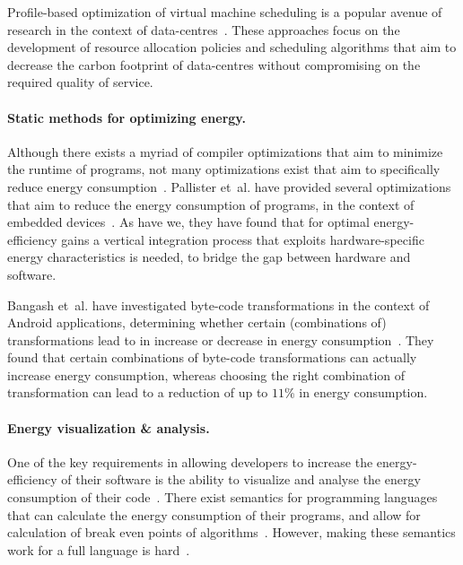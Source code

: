 Profile-based optimization of virtual machine scheduling is a popular avenue of research in the
context of data-centres~\cite{profile-based1,profile-based2,profile-based3,profile-based4}. These
approaches focus on the development of resource allocation policies and scheduling algorithms that
aim to decrease the carbon footprint of data-centres without compromising on the required quality of
service.

\paragraph{Static methods for optimizing energy.}
Although there exists a myriad of compiler optimizations that aim to minimize the runtime of
programs, not many optimizations exist that aim to specifically reduce energy
consumption~\cite{compiler-energy-differences}. Pallister et~al. have provided several optimizations
that aim to reduce the energy consumption of programs, in the context of embedded
devices~\cite{compiler-energy-flash,compiler-energy-methods}. As have we, they have found that for
optimal energy-efficiency gains a vertical integration process that exploits hardware-specific
energy characteristics is needed, to bridge the gap between hardware and software.

Bangash et~al. have investigated byte-code transformations in the context of Android applications,
determining whether certain (combinations of) transformations lead to in increase or decrease in
energy consumption~\cite{compiler-energy-android}. They found that certain combinations of byte-code
transformations can actually increase energy consumption, whereas choosing the right combination of
transformation can lead to a reduction of up to $11\%$ in energy consumption.

\paragraph{Energy visualization \& analysis.}
One of the key requirements in allowing developers to increase the energy-efficiency of their
software is the ability to visualize and analyse the energy consumption of their
code~\cite{van2023organizational}. There exist semantics for programming languages that can
calculate the energy consumption of their programs, and allow for calculation of break even points
of algorithms~\cite{symbolic-dependent-types,symbolic-dependent-types2,phdBernard}. However, making
these semantics work for a full language is hard~\cite{energy-analysis}.

